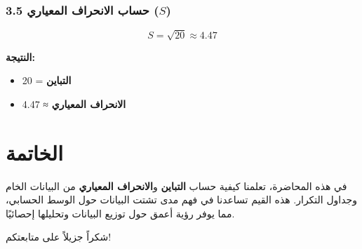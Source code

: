 \documentclass{article}
\begin{document}
\subsubsection{3.5 حساب الانحراف المعياري ($S$)}
$$
S = \sqrt{20} ≈ 4.47
$$

\textbf{النتيجة:}

\begin{itemize}
\item \textbf{التباين} = 20
\item \textbf{الانحراف المعياري} ≈ 4.47
\end{itemize}

\section{الخاتمة}

في هذه المحاضرة، تعلمنا كيفية حساب \textbf{التباين} و\textbf{الانحراف المعياري} من البيانات الخام وجداول التكرار. هذه القيم تساعدنا في فهم مدى تشتت البيانات حول الوسط الحسابي، مما يوفر رؤية أعمق حول توزيع البيانات وتحليلها إحصائيًا.

شكراً جزيلاً على متابعتكم!
\end{document}
